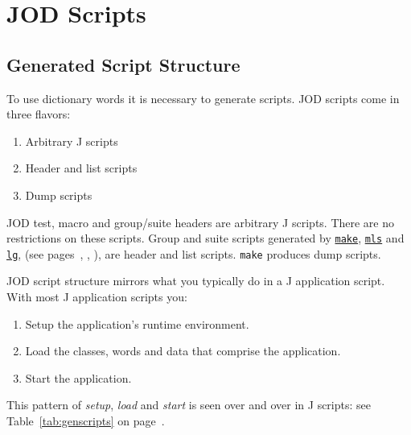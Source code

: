 
\section{JOD Scripts}

\subsection{Generated Script Structure}\label{ss:genscripts}

To use dictionary words it is necessary to generate scripts.  JOD scripts come in three flavors:
\begin{enumerate}
    \item Arbitrary J scripts 
    \item Header and list scripts
    \item Dump scripts
\end{enumerate}

JOD test, macro and group/suite headers are arbitrary J scripts.  There are no restrictions on 
these scripts.  Group and suite scripts generated by 
\hyperlink{il:make}{\texttt{make}}, \hyperlink{il:mls}{\texttt{mls}} and 
\hyperlink{il:lg}{\texttt{lg}}, (see pages~\pageref{ss:make}, \pageref{ss:mls},
\pageref{ss:lg}), are header and list scripts.  \texttt{make} produces dump scripts.  

JOD script structure mirrors what you typically do in a J application script.  With most J application scripts you: 
\begin{enumerate}
	\item Setup the application's runtime environment.
	\item Load the classes, words and data that comprise the application.
	\item Start the application.
\end{enumerate}

This pattern of \emph{setup}, \emph{load} and \emph{start} is seen over and over in J scripts: see  
Table~\ref{tab:genscripts} on page~\pageref{tab:genscripts}.


